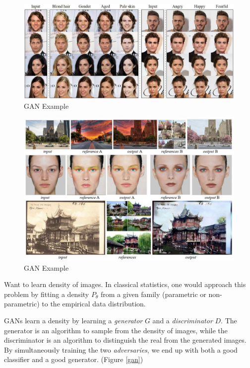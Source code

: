\documentclass[english]{article}
\begin{document}
\begin{figure}
  \centering
  \includegraphics[scale=0.25]{gan1.jpg}
    \caption{GAN Example}
    \label{gan1}
\end{figure}
\begin{figure}
  \centering
  \includegraphics[scale=0.3]{gan2.jpg}
    \caption{GAN Example}
    \label{gan2}
\end{figure}

\item 
 Want to learn density of images. In classical statistics, one would approach this problem by fitting a density $P_\theta$ from a given family (parametric or non-parametric) to the empirical data distribution. 

 GANs learn a density by learning a \emph{generator} $G$ and a \emph{discriminator} $D$. The generator is an algorithm to sample from the density of images, while the discriminator is an algorithm to distinguish the real from the generated images. By simultaneously training the two \emph{adversaries}, we end up with both a good classifier and a good generator. (Figure \ref{gan})
 
\end{document}
